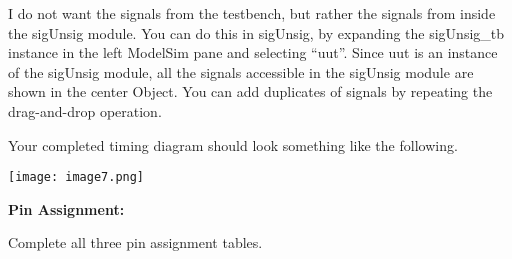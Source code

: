 I do not want the signals from the testbench, but rather the signals
from inside the sigUnsig module. You can do this in sigUnsig, by
expanding the sigUnsig\_tb instance in the left ModelSim pane and
selecting ``uut''. Since uut is an instance of the sigUnsig module, all
the signals accessible in the sigUnsig module are shown in the center
Object. You can add duplicates of signals by repeating the drag-and-drop
operation.

Your completed timing diagram should look something like the following.

\texttt{[image:  image7.png]}

\textbf{Pin Assignment:}

Complete all three pin assignment tables.

